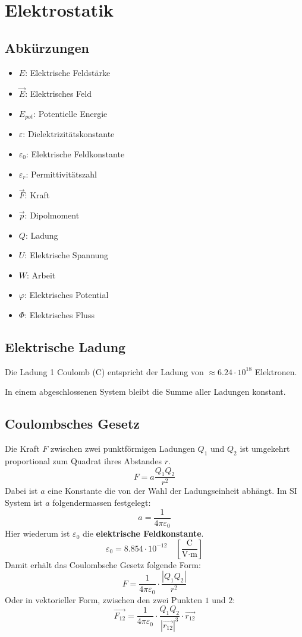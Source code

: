 \section{Elektrostatik}

\subsection{Abkürzungen}

\begin{itemize}
	\item $E$: Elektrische Feldstärke
	\item $\vec{E}$: Elektrisches Feld 
	\item $E_{pot}$: Potentielle Energie
	\item $\varepsilon$: Dielektrizitätskonstante
	\item $\varepsilon_0$: Elektrische Feldkonstante
	\item $\varepsilon_r$: Permittivitätszahl
	\item $\vec{F}$: Kraft
	\item $\vec{p}$: Dipolmoment
	\item $Q$: Ladung
	\item $U$: Elektrische Spannung
	\item $W$: Arbeit
	\item $\varphi$: Elektrisches Potential
	\item $\Phi$: Elektrisches Fluss
\end{itemize}

\subsection{Elektrische Ladung}

Die Ladung 1 Coulomb (C) entspricht der Ladung von $\approx 6.24 \cdot 10^{18}$
Elektronen.

In einem abgeschlossenen System bleibt die Summe aller Ladungen konstant.

\subsection{Coulombsches Gesetz}

Die Kraft $F$ zwischen zwei punktförmigen Ladungen $Q_1$ und $Q_2$ ist umgekehrt
proportional zum Quadrat ihres Abstandes $r$.
\[
	F = a \frac{Q_1Q_2}{r^2}
\]
Dabei ist $a$ eine Konstante die von der Wahl der Ladungseinheit abhängt. Im SI
System ist $a$ folgendermassen festgelegt:
\[
	a = \frac{1}{4 \pi \varepsilon_0}
\]
Hier wiederum ist $\varepsilon_0$ die \textbf{elektrische Feldkonstante}.
\[
	\varepsilon_0 = 8.854 \cdot 10^{-12}
	\quad \left[ \frac{\textrm{C}}{\textrm{V}\cdot \textrm{m}} \right]
\]
Damit erhält das Coulombsche Gesetz folgende Form:
\[
	F = \frac{1}{4\pi\varepsilon_0} \cdot \frac{|Q_1Q_2|}{r^2}
\]
Oder in vektorieller Form, zwischen den zwei Punkten $1$ und $2$:
\[
	\vec{F_{12}} = \frac{1}{4\pi\varepsilon_0}
	\cdot \frac{Q_1Q_2}{|\vec{r_{12}}|^3}
	\cdot \vec{r_{12}}
\]

